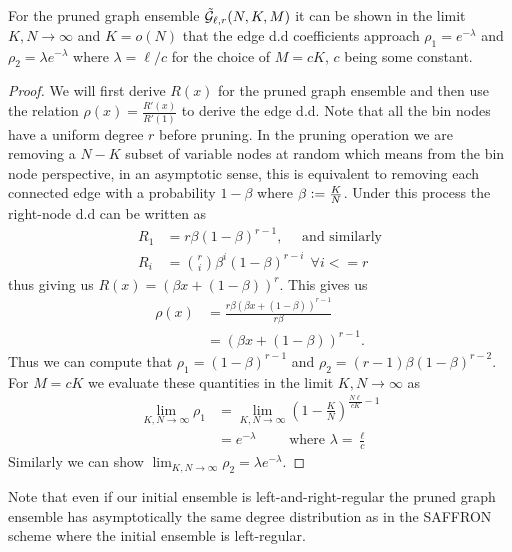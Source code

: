 \begin{lemma}
\label{Lem:EdgeDDPrunedGraph}
For the pruned graph ensemble $\tilde{\mathcal{G}}_{\ell,r}(N,K,M)$ it can be shown in the limit $K,N\rightarrow\infty$ and $K=o(N)$ that the edge d.d coefficients approach $\rho_{1}=e^{-\lambda}$ and $\rho_{2}=\lambda e^{-\lambda}$ where $\lambda=\ell/c$ for the choice of $M=cK$, $c$ being some constant.
\end{lemma}
\begin{proof}
We will first derive $R(x)$ for the pruned graph ensemble and then use the relation $\rho(x)=\frac{R'(x)}{R'(1)}$\cite{richardson2008modern}  to derive the edge d.d. Note that all the bin nodes have a uniform degree $r$ before pruning. In the pruning operation we are removing a $N-K$ subset of variable nodes at random which means from the bin node perspective, in an asymptotic sense, this is equivalent to removing each connected edge with a probability $1-\beta$ where $\beta\mathrel{\mathop:}= \frac{K}{N}$. Under this process the right-node d.d can be written as
\begin{align}
R_1&=r\beta(1-\beta)^{r-1},\quad \text{ and similarly}\label{Eqn:Deg1ChkDistribution}\\
R_i &=\binom{r}{i} \beta^{i}(1-\beta)^{r-i} ~~\forall i<=r \nonumber
\end{align}
thus giving us $R(x)=(\beta x+(1-\beta))^{r}$. This gives us 
\begin{align*}
\rho(x)&=\frac{r\beta(\beta x+(1-\beta))^{r-1}}{r\beta}\\
          &=(\beta x+(1-\beta))^{r-1}.
\end{align*}
Thus we can compute that $\rho_1=(1-\beta)^{r-1}$ and $\rho_2=(r-1)\beta(1-\beta)^{r-2}$. For $M=c K$ we evaluate these quantities in the limit $K,N\rightarrow \infty$ as
\begin{align*}
\lim_{K,N\rightarrow \infty} \rho_1&=\lim_{K,N\rightarrow \infty} \left(1-\frac{K}{N}\right)^{\frac{N\ell}{c K}-1}\\
&=e^{-\lambda} \qquad \text{ where } \lambda=\frac{\ell}{c}
\end{align*}
Similarly we can show $\lim_{K,N\rightarrow \infty}\rho_2=\lambda e^{-\lambda}$.
\end{proof}

Note that even if our initial ensemble is left-and-right-regular the pruned graph ensemble has asymptotically the same degree distribution as in the SAFFRON scheme where the initial ensemble is left-regular.


